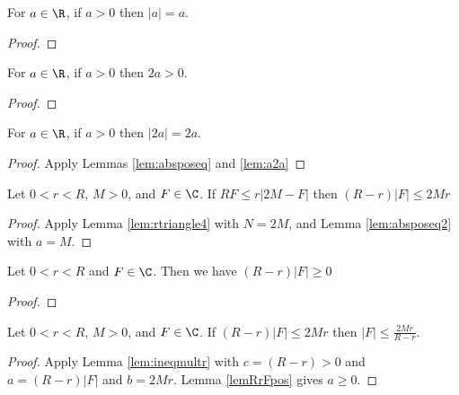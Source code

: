 \begin{lemma}\label{lem:absposeq}  \leanok
For $a\in\R$, if $a>0$ then $|a|=a$.
\end{lemma}
\begin{proof} \leanok
\end{proof}

\begin{lemma}\label{lem:a2a}  \leanok
For $a\in\R$, if $a>0$ then $2a>0$.
\end{lemma}
\begin{proof} \leanok
\end{proof}

\begin{lemma}\label{lem:absposeq2}  \leanok
For $a\in\R$, if $a>0$ then $|2a|=2a$.
\end{lemma}
\begin{proof} \leanok {}
Apply Lemmas \ref{lem:absposeq} and \ref{lem:a2a}
\end{proof}

\begin{lemma} \label{lem:rtriangle5}  \leanok
Let $0<r<R$, $M>0$, and $F\in\C$. If $RF \le r|2M-F|$ then $(R-r)|F| \le 2Mr$
\end{lemma}
\begin{proof}  \leanok
Apply Lemma \ref{lem:rtriangle4} with $N=2M$, and Lemma \ref{lem:absposeq2} with $a=M$.
\end{proof}

\begin{lemma}\label{lemRrFpos}  \leanok
Let $0<r<R$ and $F\in\C$. Then we have $(R-r)|F| \ge0$
\end{lemma}
\begin{proof} \leanok
\end{proof}

\begin{lemma} \label{lem:rtriangle6}  \leanok
Let $0<r<R$, $M>0$, and $F\in\C$. If $(R-r)|F| \le 2Mr$ then $|F| \le \frac{2Mr}{R-r}$.
\end{lemma}
\begin{proof} \leanok {}
Apply Lemma \ref{lem:ineqmultr} with $c=(R-r)>0$ and $a=(R-r)|F|$ and $b=2Mr$. Lemma \ref{lemRrFpos} gives $a\ge0$.
\end{proof}

